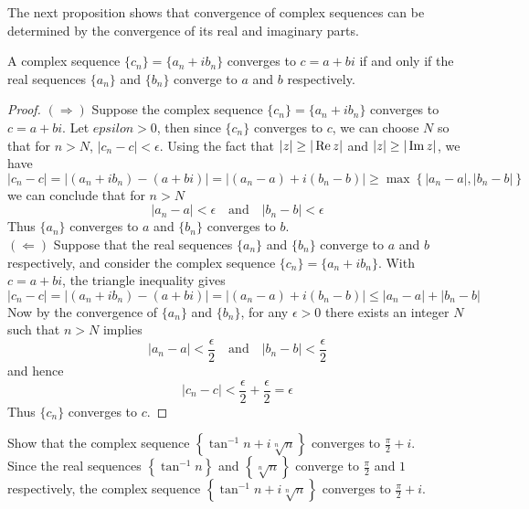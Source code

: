 \documentclass[handout]{ximera}
\begin{document}
The next proposition shows that convergence of complex sequences can be determined by the convergence of its real and imaginary parts.

\begin{proposition}
A complex sequence $\{c_n\} = \{a_n + ib_n\}$ converges to $c = a+bi$ if and only if the real 
sequences $\{a_n\}$ and $\{b_n\}$ converge to $a$ and $b$ respectively.
\end{proposition}
\begin{proof}
$\left(\Rightarrow\right)$ \; Suppose the complex sequence $\{c_n\} = \{a_n + ib_n\}$ converges to $c = a+bi$.
Let $epsilon >0$, then since $\{c_n\}$ converges to $c$, we can choose $N$ so that for $n>N$, $|c_n - c| < \epsilon$.
Using the fact that $|z| \geq |\operatorname{Re} z|$ and $|z| \geq |\operatorname{Im} z|$, we have 
\[
|c_n - c| = |(a_n + ib_n) - (a+bi)| = |(a_n -a) + i(b_n -b)| \geq \max\left\{|a_n-a|, |b_n -b|\right\}
\]
we can conclude that for $n>N$
\[
|a_n-a| < \epsilon \quad \text{and} \quad  |b_n -b| < \epsilon
\]
Thus $\{a_n\}$ converges to $a$ and $\{b_n\}$ converges to $b$.\\
$\left(\Leftarrow\right)$ Suppose that the real sequences $\{a_n\}$ and $\{b_n\}$ converge to $a$ and $b$ respectively, 
and consider the complex sequence $\{c_n\} = \{a_n + ib_n\}$. With $c = a+bi$, the triangle inequality gives
\[
|c_n - c| = |(a_n + ib_n) - (a+bi)| = |(a_n -a) + i(b_n -b)| \leq |a_n-a|+ |b_n -b|
\]
Now by the convergence of $\{a_n\}$ and $\{b_n\}$, for any $\epsilon >0$ there exists an integer $N$ such that $n>N$ implies
\[
|a_n-a| < \frac{\epsilon}{2} \quad \text{and} \quad  |b_n -b| < \frac{\epsilon}{2}
\]
and hence
\[
|c_n-c| < \frac{\epsilon}{2}+\frac{\epsilon}{2}= \epsilon 
\]
Thus $\{c_n\}$ converges to $c$.
\end{proof}

\begin{example}
Show that the complex sequence $\displaystyle \left\{\tan^{-1} n + i\sqrt[n]n\right\}$ converges to $\displaystyle \frac{\pi}{2} + i$.\\
Since the real sequences $\displaystyle \left\{\tan^{-1} n\right\}$ and $\displaystyle \left\{\sqrt[n]n\right\}$ converge to 
$\displaystyle \frac{\pi}{2}$ and $1$ respectively, the complex sequence 
$\displaystyle \left\{\tan^{-1} n + i\sqrt[n]n\right\}$ converges to $\displaystyle \frac{\pi}{2} + i$.
\end{example}
\end{document}
